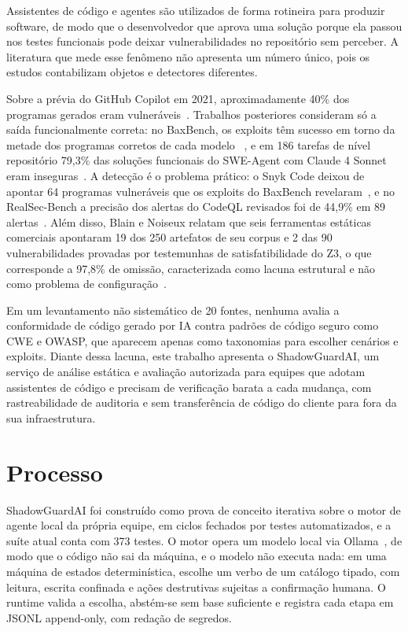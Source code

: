 \documentclass[12pt]{article}
\newcommand{\product}{ShadowGuardAI}
\begin{document}
Assistentes de código e agentes são utilizados de forma rotineira para produzir software, de
modo que o desenvolvedor que aprova uma solução porque ela passou nos testes funcionais pode
deixar vulnerabilidades no repositório sem perceber. A literatura que mede esse fenômeno não
apresenta um número único, pois os estudos contabilizam objetos e detectores diferentes.

Sobre a prévia do GitHub Copilot em 2021, aproximadamente 40\% dos programas gerados eram vulneráveis~\cite{pearce2021asleep}.
Trabalhos posteriores consideram só a saída funcionalmente correta: no BaxBench, os
exploits têm sucesso em torno da metade dos programas corretos de cada modelo
~\cite{vero2025baxbench}, e em 186 tarefas de nível repositório 79,3\% das soluções funcionais
do SWE-Agent com Claude 4 Sonnet eram inseguras~\cite{zhao2026vibe}. A detecção é o problema
prático: o Snyk Code deixou de apontar 64 programas vulneráveis que os exploits do BaxBench
revelaram~\cite{vero2025baxbench}, e no RealSec-Bench a precisão dos alertas do CodeQL revisados
foi de 44,9\% em 89 alertas~\cite{wang2026realsec}. Além disso, Blain e Noiseux relatam que seis ferramentas
estáticas comerciais apontaram 19 dos 250 artefatos de seu corpus e 2 das 90 vulnerabilidades
provadas por testemunhas de satisfatibilidade do Z3, o que corresponde a 97,8\% de omissão,
caracterizada como lacuna estrutural e não como problema de configuração~\cite{blain2026broken}.

Em um levantamento não sistemático de 20 fontes, nenhuma avalia a conformidade de código gerado
por IA contra padrões de código seguro como CWE e OWASP, que aparecem apenas como taxonomias
para escolher cenários e exploits. Diante dessa lacuna, este trabalho apresenta o \product{}, um
serviço de análise estática e avaliação autorizada para equipes que adotam assistentes de
código e precisam de verificação barata a cada mudança, com rastreabilidade de auditoria e sem
transferência de código do cliente para fora da sua infraestrutura.

\section{Processo}

\product{} foi construído como prova de conceito iterativa sobre o motor de agente local da
própria equipe, em ciclos fechados por testes automatizados, e a suíte atual conta com 373
testes. O motor opera um modelo local via Ollama~\cite{ollama}, de modo que o código não sai da máquina, e o modelo não
executa nada: em uma máquina de estados determinística, escolhe um verbo de um catálogo
tipado, com leitura, escrita confinada e ações destrutivas sujeitas a confirmação humana. O
runtime valida a escolha, abstém-se sem base suficiente e registra cada etapa em
JSONL append-only, com redação de segredos.
\end{document}
